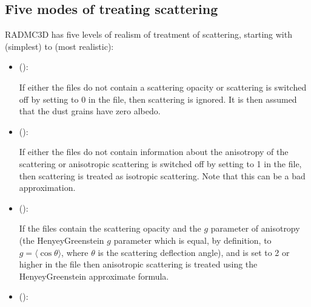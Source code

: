 \documentclass[letterpaper,10pt,english]{sphinxmanual}
\begin{document}
\subsection{Five modes of treating scattering}
\label{\detokenize{dustradtrans:five-modes-of-treating-scattering}}\label{\detokenize{dustradtrans:sec-modes-of-scattering}}
RADMC\sphinxhyphen{}3D has five levels of realism of treatment of scattering, starting
with  (simplest) to  (most realistic):
\begin{itemize}
\item {} 
 ():

If either the  files do not contain a scattering opacity
or scattering is switched off by setting  to 0 in the
 file, then scattering is ignored. It is then assumed that the
dust grains have zero albedo.

\item {} 
 ():

If either the  files do not contain information about the
anisotropy of the scattering or anisotropic scattering is switched off by
setting  to 1 in the  file, then
scattering is treated as isotropic scattering.  Note that this can be a bad
approximation.

\item {} 
 ():

If the  files contain the scattering opacity and the
\(g\) parameter of anisotropy (the Henyey\sphinxhyphen{}Greenstein \(g\) parameter
which is equal, by definition, to \(g=\langle\cos\theta\rangle\), where
\(\theta\) is the scattering deflection angle), and
 is set to 2 or higher in the  file then
anisotropic scattering is treated using the Henyey\sphinxhyphen{}Greenstein approximate
formula.

\item {} 
 ():


\end{itemize}
\end{document}
